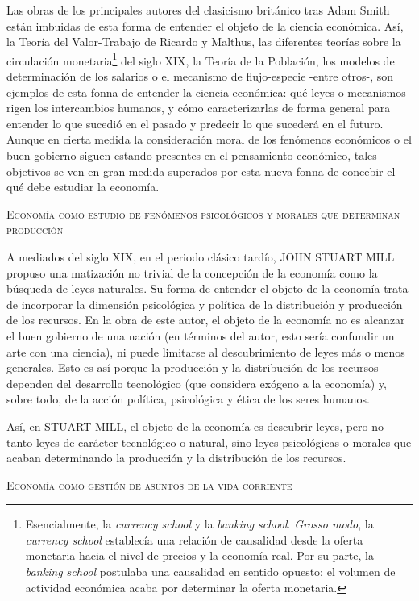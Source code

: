 \documentclass[10pt,a4paper]{article}
\begin{document}
Las obras de los principales autores del clasicismo británico tras Adam Smith están imbuidas de esta forma de entender el objeto de la ciencia económica. Así, la Teoría del Valor-Trabajo de Ricardo y Malthus, las diferentes teorías sobre la circulación monetaria\footnote{%
    Esencialmente, la \textit{currency school} y la \textit{banking school}. \textit{Grosso modo}, la \textit{currency school} establecía una relación de causalidad desde la oferta monetaria hacia el nivel de precios y la economía real. Por su parte, la \textit{banking school} postulaba una causalidad en sentido opuesto: el volumen de actividad económica acaba por determinar la oferta monetaria.
} del siglo XIX, la Teoría de la Población, los modelos de determinación de los salarios o el mecanismo de flujo-especie -entre otros-, son ejemplos de esta fonna de entender la ciencia económica: qué leyes o mecanismos rigen los intercambios humanos, y cómo caracterizarlas de forma general para entender lo que sucedió en el pasado y predecir lo que sucederá en el futuro. Aunque en cierta medida la consideración moral de los fenómenos económicos o el buen gobierno siguen estando presentes en el pensamiento económico, tales objetivos se ven en gran medida superados por esta nueva fonna de concebir el qué debe estudiar la economía.

\textsc{Economía como estudio de fenómenos psicológicos y morales que determinan producción}

A mediados del siglo XIX, en el periodo clásico tardío, JOHN STUART MILL propuso una matización no trivial de la concepción de la economía como la búsqueda de leyes naturales. Su forma de entender el objeto de la economía trata de incorporar la dimensión psicológica y política de la distribución y producción de los recursos. En la obra de este autor, el objeto de la economía no es alcanzar el buen gobierno de una nación (en términos del autor, esto sería confundir un arte con una ciencia), ni puede limitarse al descubrimiento de leyes más o menos generales. Esto es así porque la producción y la distribución de los recursos dependen del desarrollo tecnológico (que considera exógeno a la economía) y, sobre todo, de la acción política, psicológica y ética de los seres humanos. 

Así, en STUART MILL, el objeto de la economía es descubrir leyes, pero no tanto leyes de carácter tecnológico o natural, sino leyes psicológicas o morales que acaban determinando la producción y la distribución de los recursos. 

\textsc{Economía como gestión de asuntos de la vida corriente}
\end{document}

